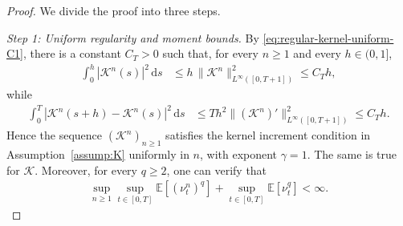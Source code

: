 \documentclass[10pt,a4paper,reqno]{amsart}
\theoremstyle{plain}
\theoremstyle{definition}
\theoremstyle{remark}
\theoremstyle{example}
\begin{document}
\begin{proof}
We divide the proof into three steps.

\emph{Step 1: Uniform regularity and moment bounds.} By \eqref{eq:regular-kernel-uniform-C1}, there is a constant $C_T>0$ such that, for every $n\geq1$ and every $h\in(0,1]$,
\begin{align*}
    \int_0^h |\mathcal K^n(s)|^2\,\mathrm ds &\leq h\,\|\mathcal K^n\|_{L^\infty([0,T+1])}^2 \leq C_T h,
\end{align*}
while
\begin{align*}
    \int_0^T |\mathcal K^n(s+h)-\mathcal K^n(s)|^2\,\mathrm ds &\leq T h^2 \|(\mathcal K^n)'\| _{L^\infty([0,T+1])}^2 \leq C_T h.
\end{align*}
Hence the sequence $(\mathcal K^n)_{n\geq1}$ satisfies the kernel increment condition in Assumption~\ref{assump:K} uniformly in $n$, with exponent $\gamma=1$. The same is true for $\mathcal K$. Moreover, for every $q\geq2$, one can verify that
\begin{align}
    \sup_{n\geq1}\sup_{t\in[0,T]} \mathbb E[(\nu_t^n)^q] + \sup_{t\in[0,T]} \mathbb E[\nu_t^q] < \infty. \label{eq:uniform-variance-q-moments-regular}
\end{align}


\end{proof}
\end{document}
